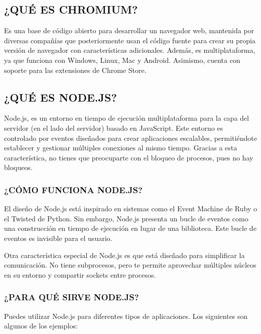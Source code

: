 \newpage

\subsection{¿QUÉ ES CHROMIUM?}

Es una base de código abierto para desarrollar un navegador web, mantenida por diversas compañías que posteriormente usan el código fuente para crear su propia versión de navegador con características adicionales.
Además, es multiplataforma, ya que funciona con Windows, Linux, Mac y Android. Asimismo, cuenta con soporte para las extensiones de Chrome Store.\cite{Chromium}

\subsection{¿QUÉ ES NODE.JS?}

Node.js, es un entorno en tiempo de ejecución multiplataforma para la capa del servidor (en el lado del servidor) basado en JavaScript.
Este entorno es controlado por eventos diseñados para crear aplicaciones escalables, permitiéndote establecer y gestionar múltiples conexiones al mismo tiempo. Gracias a esta característica, no tienes que preocuparte con el bloqueo de procesos, pues no hay bloqueos.\cite{Nodejs}

\subsubsection{¿CÓMO FUNCIONA NODE.JS?}
El diseño de Node.js está inspirado en sistemas como el Event Machine de Ruby o el Twisted de Python. Sin embargo, Node.js presenta un bucle de eventos como una construcción en tiempo de ejecución en lugar de una biblioteca. Este bucle de eventos es invisible para el usuario.

Otra característica especial de Node.js es que está diseñado para simplificar la comunicación. No tiene subprocesos, pero te permite aprovechar múltiples núcleos en su entorno y compartir sockets entre procesos.\cite{Nodejs}


\subsubsection{¿PARA QUÉ SIRVE NODE.JS?}
Puedes utilizar Node.js para diferentes tipos de aplicaciones. Los siguientes son algunos de los ejemplos:

